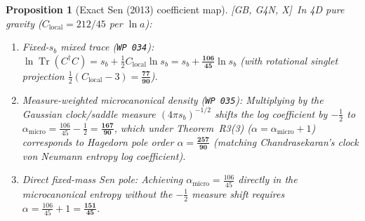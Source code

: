 \documentclass[11pt]{amsart}
\numberwithin{equation}{section}
\theoremstyle{plain}
\newtheorem{proposition}[theorem]{Proposition}
\theoremstyle{definition}\newtheorem{definition}[theorem]{Definition}
\theoremstyle{remark}\newtheorem{remark}[theorem]{Remark}
\newcommand{\ctag}[1]{\textup{\textsf{\scriptsize[#1]}}}
\begin{document}
\begin{proposition}[Exact Sen (2013) coefficient map]\label{prop:sen}
\ctag{GB, G4N, X}\ In 4D pure gravity ($C_{\mathrm{local}} = 212/45$ per $\ln a$):
\begin{enumerate}[nosep]
\item \emph{Fixed-$s_b$ mixed trace (\texttt{WP~034}):} $\ln \operatorname{Tr}(C^\dagger C) = s_b + \frac12 C_{\mathrm{local}} \ln s_b = s_b + \mathbf{\frac{106}{45}}\ln s_b$ (with rotational singlet projection $\frac12(C_{\mathrm{local}} - 3) = \mathbf{\frac{77}{90}}$).
\item \emph{Measure-weighted microcanonical density (\texttt{WP~035}):} Multiplying by the Gaussian clock/saddle measure $(4\pi s_b)^{-1/2}$ shifts the log coefficient by $-\frac12$ to $\alpha_{\mathrm{micro}} = \frac{106}{45} - \frac12 = \mathbf{\frac{167}{90}}$, which under Theorem~R3(3) ($\alpha = \alpha_{\mathrm{micro}} + 1$) corresponds to Hagedorn pole order $\alpha = \mathbf{\frac{257}{90}}$ (matching Chandrasekaran's clock von Neumann entropy log coefficient).
\item \emph{Direct fixed-mass Sen pole:} Achieving $\alpha_{\mathrm{micro}} = \frac{106}{45}$ directly in the microcanonical entropy without the $-\frac12$ measure shift requires $\alpha = \frac{106}{45} + 1 = \mathbf{\frac{151}{45}}$.
\end{enumerate}
\end{proposition}
\end{document}
